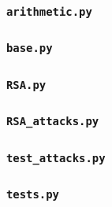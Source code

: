 \documentclass{beamer}
\begin{document}
    \begin{frame}[allowframebreaks]
        \frametitle{\texttt{arithmetic.py}}

        
    \end{frame}

    \begin{frame}[allowframebreaks]
        \frametitle{\texttt{base.py}}

        
    \end{frame}

    \begin{frame}[allowframebreaks]
        \frametitle{\texttt{RSA.py}}

        
    \end{frame}

    \begin{frame}[allowframebreaks]
        \frametitle{\texttt{RSA\_attacks.py}}

        
    \end{frame}

    \begin{frame}[allowframebreaks]
        \frametitle{\texttt{test\_attacks.py}}

        
    \end{frame}

    \begin{frame}[allowframebreaks]
        \frametitle{\texttt{tests.py}}

        
    \end{frame}
\end{document}
